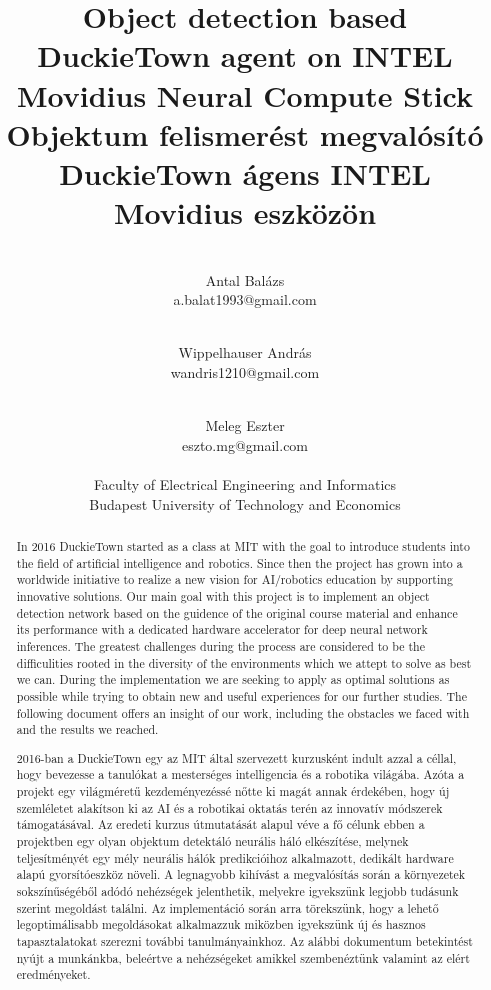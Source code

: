 \documentclass{article}
\title{Object detection based DuckieTown agent on INTEL Movidius Neural Compute Stick \\
	\large Objektum felismerést megvalósító DuckieTown ágens INTEL Movidius eszközön}
\author{ \\
Antal Balázs\\ a.balat1993@gmail.com
\and \\
Wippelhauser András\\ wandris1210@gmail.com
\and \\
Meleg Eszter\\ eszto.mg@gmail.com\\
\\
Faculty of Electrical Engineering and Informatics\\
Budapest University of Technology and Economics\\
}
\begin{document}
\maketitle

\begin{abstract}
In 2016 DuckieTown started as a class at MIT with the goal to introduce students into the field of artificial intelligence and robotics. Since then the project has grown into a worldwide initiative to realize a new vision for AI/robotics education by supporting innovative solutions. Our main goal with this project is to implement an object detection network based on the guidence of the original course material and enhance its performance with a dedicated hardware accelerator for deep neural network inferences. The greatest challenges during the process are considered to be the difficulities rooted in the diversity of the environments which we attept to solve as best we can. During the implementation we are seeking to apply as optimal solutions as possible while trying to obtain new and useful experiences for our further studies. The following document offers an insight of our work, including the obstacles we faced with and the results we reached. 
\end{abstract}

\begin{abstract}

2016-ban a DuckieTown egy az MIT által szervezett kurzusként indult azzal a céllal, hogy bevezesse a tanulókat a mesterséges intelligencia és a robotika világába. Azóta a projekt egy világméretű kezdeményezéssé nőtte ki magát annak érdekében, hogy új szemléletet alakítson ki az AI és a robotikai oktatás terén az innovatív módszerek támogatásával. Az eredeti kurzus útmutatását alapul véve a fő célunk ebben a projektben egy olyan objektum detektáló neurális háló elkészítése, melynek teljesítményét egy mély neurális hálók predikcióihoz alkalmazott, dedikált hardware alapú gyorsítóeszköz növeli. A legnagyobb kihívást a megvalósítás során a környezetek sokszínűségéből adódó nehézségek jelenthetik, melyekre igyekszünk legjobb tudásunk szerint megoldást találni. Az implementáció során arra törekszünk, hogy a lehető legoptimálisabb megoldásokat alkalmazzuk miközben igyekszünk új és hasznos tapasztalatokat szerezni további tanulmányainkhoz. Az alábbi dokumentum  betekintést nyújt a munkánkba, beleértve a nehézségeket amikkel szembenéztünk valamint az elért eredményeket. 
\end{abstract}
\end{document}
